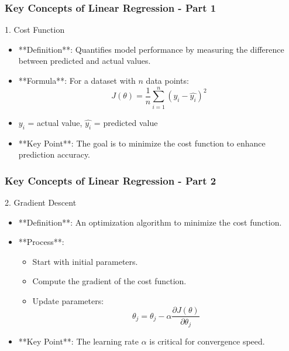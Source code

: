 \documentclass{beamer}
\begin{document}
\begin{frame}[fragile]
    \frametitle{Key Concepts of Linear Regression - Part 1}
    \begin{block}{1. Cost Function}
        \begin{itemize}
            \item **Definition**: Quantifies model performance by measuring the difference between predicted and actual values.
            \item **Formula**: For a dataset with \( n \) data points:
            \[
            J(\theta) = \frac{1}{n} \sum_{i=1}^{n} (y_i - \hat{y_i})^2
            \]
            \item \( y_i \) = actual value, \( \hat{y_i} \) = predicted value
            \item **Key Point**: The goal is to minimize the cost function to enhance prediction accuracy.
        \end{itemize}
    \end{block}
\end{frame}

\begin{frame}[fragile]
    \frametitle{Key Concepts of Linear Regression - Part 2}
    \begin{block}{2. Gradient Descent}
        \begin{itemize}
            \item **Definition**: An optimization algorithm to minimize the cost function.
            \item **Process**:
                \begin{itemize}
                    \item Start with initial parameters.
                    \item Compute the gradient of the cost function.
                    \item Update parameters:
                    \[
                    \theta_j = \theta_j - \alpha \frac{\partial J(\theta)}{\partial \theta_j}
                    \]
                    \end{itemize}
            \item **Key Point**: The learning rate \( \alpha \) is critical for convergence speed.
        \end{itemize}
    \end{block}
\end{frame}
\end{document}
